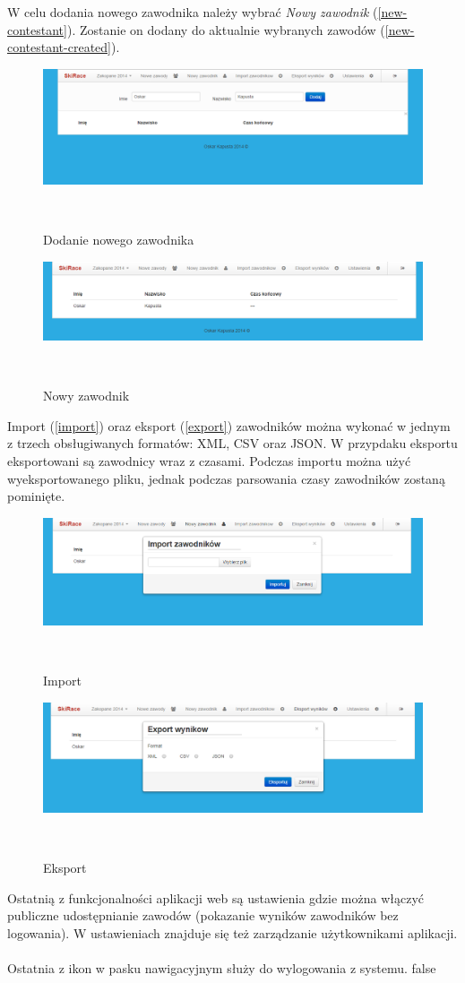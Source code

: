 \documentclass[11pt,a4paper, twoside]{article}
\begin{document}
\noindent
W celu dodania nowego zawodnika należy wybrać \emph{Nowy zawodnik} (\ref{new-contestant}). Zostanie on dodany do aktualnie wybranych zawodów (\ref{new-contestant-created}).
\begin{figure}[H]
\centering
\includegraphics[scale=0.3]{./img/newcontestant.png}
\caption{Dodanie nowego zawodnika}
$\label{new-contestant}$
\end{figure}
\begin{figure}[H]
\centering
\includegraphics[scale=0.3]{./img/newcontestant-created.png}
\caption{Nowy zawodnik}
$\label{new-contestant-created}$
\end{figure}
\noindent
Import (\ref{import}) oraz eksport (\ref{export}) zawodników można wykonać w jednym z trzech obsługiwanych formatów: XML, CSV oraz JSON. W przypdaku eksportu eksportowani są zawodnicy wraz z czasami. Podczas importu można użyć wyeksportowanego pliku, jednak podczas parsowania czasy zawodników zostaną pominięte.
\begin{figure}[H]
\centering
\includegraphics[scale=0.3]{./img/import.png}
\caption{Import}
$\label{import}$
\end{figure}
\begin{figure}[H]
\centering
\includegraphics[scale=0.3]{./img/export.png}
\caption{Eksport}
$\label{export}$
\end{figure}
\noindent
Ostatnią z funkcjonalności aplikacji web są ustawienia gdzie można włączyć publiczne udostępnianie zawodów (pokazanie wyników zawodników bez logowania). W ustawieniach znajduje się też zarządzanie użytkownikami aplikacji.
\\
\\
\noindent
Ostatnia z ikon w pasku nawigacyjnym służy do wylogowania z systemu.
\if false
\newpage
\end{document}
